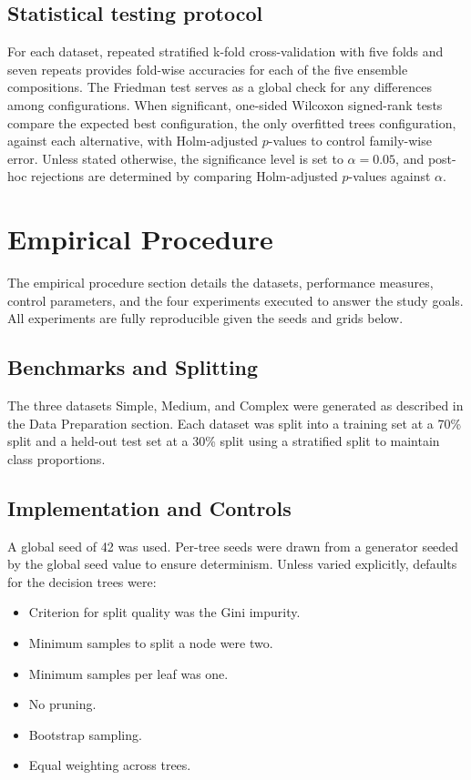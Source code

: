 \documentclass[conference]{IEEEtran}
\begin{document}
\subsection{Statistical testing protocol}
For each dataset, repeated stratified k-fold cross-validation with five folds and seven repeats provides fold-wise accuracies for each of the five ensemble compositions. The Friedman test serves as a global check for any differences among configurations. When significant, one-sided Wilcoxon signed-rank tests compare the expected best configuration, the only overfitted trees configuration, against each alternative, with Holm-adjusted $p$-values to control family-wise error. Unless stated otherwise, the significance level is set to $\alpha=0.05$, and post-hoc rejections are determined by comparing Holm-adjusted $p$-values against $\alpha$.


\section{Empirical Procedure}

The empirical procedure section details the datasets, performance measures, control parameters, and the four experiments executed to answer the study goals. All experiments are fully 
reproducible given the seeds and grids below.

\subsection{Benchmarks and Splitting}
The three datasets Simple, Medium, and Complex were generated as described in the Data Preparation section. Each dataset was split into a training set at a 70\% split and a held-out test set at a 30\% split using a stratified split to maintain class proportions.

\subsection{Implementation and Controls}
A global seed of 42 was used. Per-tree seeds were drawn from a generator seeded by the global seed value to ensure determinism. Unless varied explicitly, defaults for the decision trees were:
\begin{itemize}
  \item Criterion for split quality was the Gini impurity.
  \item Minimum samples to split a node were two.
  \item Minimum samples per leaf was one.
  \item No pruning.
  \item Bootstrap sampling.
  \item Equal weighting across trees.
\end{itemize}
\end{document}
